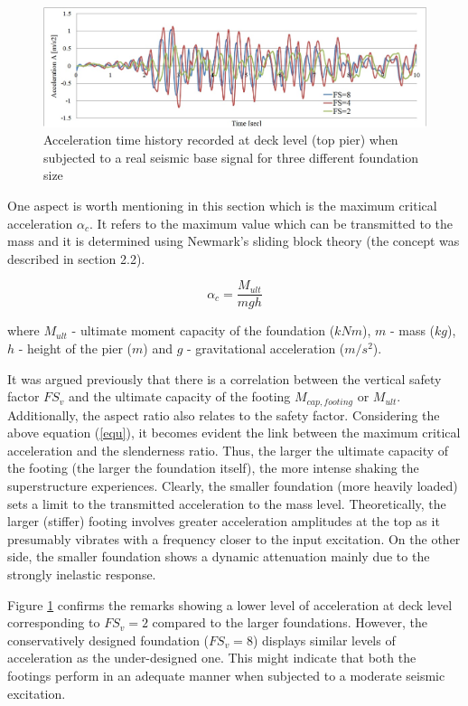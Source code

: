  \begin{figure}[!h]
 	\centering
 	\includegraphics[width=0.9\linewidth]{"acc_2,4,8"}
 	\caption{Acceleration time history recorded at deck level (top pier) when subjected to a real seismic base signal for three different foundation size}
 	\label{eq3}
 \end{figure}

One aspect is worth mentioning in this section which is the maximum critical acceleration $\alpha_c$. It refers to the maximum value which can be transmitted to the mass and it is determined using Newmark's sliding block theory (the concept was described in section 2.2).

\begin{equation}
	\alpha_c=\frac{M_{ult}}{mgh}
	\label{equ}
\end{equation}

where $M_{ult}$ - ultimate moment capacity of the foundation ($kNm$), $m$ - mass ($kg$), $h$ - height of the pier ($m$) and $g$ - gravitational acceleration ($m/s^2$).

It was argued previously that there is a correlation between the vertical safety factor $FS_v$ and the ultimate capacity of the footing $M_{cap, footing}$ or $M_{ult}$. Additionally, the aspect ratio also relates to the safety factor. Considering the above equation (\ref{equ}), it becomes evident the link between the maximum critical acceleration and the slenderness ratio. Thus, the larger the ultimate capacity of the footing (the larger the foundation itself), the more intense shaking the superstructure experiences. Clearly, the smaller foundation (more heavily loaded) sets a limit to the transmitted acceleration to the mass level. Theoretically, the larger (stiffer) footing involves greater acceleration amplitudes at the top as it presumably vibrates with a frequency closer to the input excitation. On the other side, the smaller foundation shows a dynamic attenuation mainly due to the strongly inelastic response.

Figure \ref{eq3} confirms the remarks showing a lower level of acceleration at deck level corresponding to $FS_v=2$ compared to the larger foundations. However, the conservatively designed foundation ($FS_v=8$) displays similar levels of acceleration as the under-designed one. This might indicate that both the footings perform in an adequate manner when subjected to a moderate seismic excitation. 


